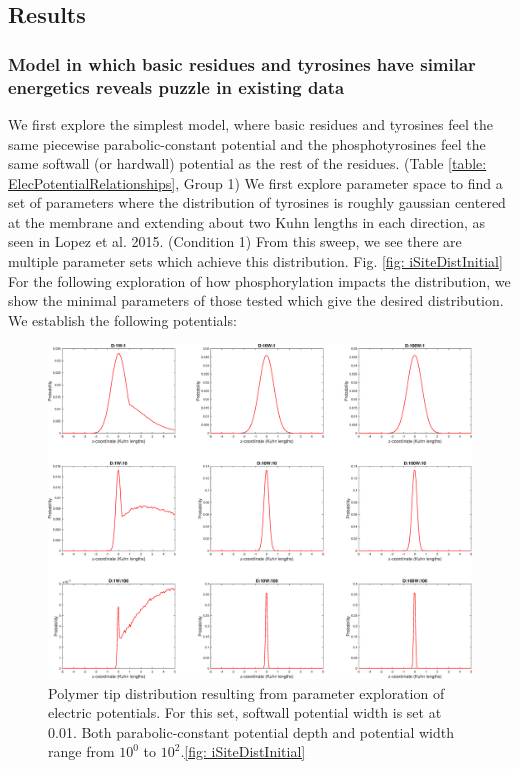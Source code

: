 \documentclass[../../AdvancementSummary.tex]{subfiles}
\begin{document}
\subsection{Results}
\subsubsection{Model in which basic residues and tyrosines have similar energetics reveals puzzle in existing data}

We first explore the simplest model, where basic residues and tyrosines feel the same piecewise parabolic-constant potential and the phosphotyrosines feel the same softwall (or hardwall) potential as the rest of the residues. (Table \ref{table: ElecPotentialRelationships}, Group 1) We first explore parameter space to find a set of parameters where the distribution of tyrosines is roughly gaussian centered at the membrane and extending about two Kuhn lengths in each direction, as seen in Lopez et al. 2015. (Condition 1) From this sweep, we see there are multiple parameter sets which achieve this distribution.  Fig. \ref{fig: iSiteDistInitial} For the following exploration of how phosphorylation impacts the distribution, we show the minimal parameters of those tested which give the desired distribution. We establish the following potentials:


\begin{figure}[H]
\begin{center}
\includegraphics[width=0.8\linewidth]{ResultsFigures/CD3ZetaSoftwallPiecewiseBasicsY/DistributioniSite7.eps}
\end{center}
\caption{Polymer tip distribution resulting from parameter exploration of electric potentials. For this set, softwall potential width is set at 0.01. Both parabolic-constant potential depth and potential width range from $10^0$ to $10^{2}$.\ref{fig: iSiteDistInitial}}
\end{figure}
\end{document}
